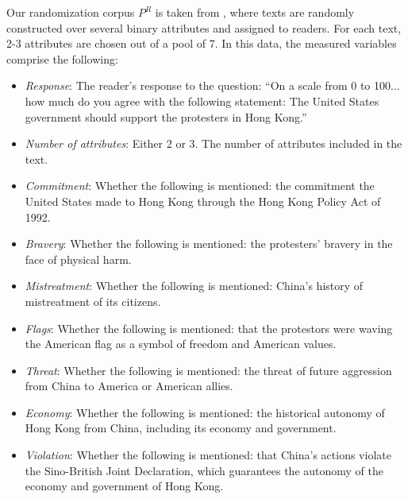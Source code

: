 \documentclass{article}
\begin{document}
Our randomization corpus $P^R$ is taken from \cite{fong2021causal}, where texts are randomly constructed over several binary attributes and assigned to readers. For each text, 2-3 attributes are chosen out of a pool of 7. In this data, the measured variables comprise the following:
\begin{itemize}
    \item \textit{Response}: The reader's response to the question: ``On a scale from 0 to 100... how much do you agree with the following statement: The United States government should support the protesters in Hong Kong.''
    \item \textit{Number of attributes}: Either 2 or 3. The number of attributes included in the text.
    \item \textit{Commitment}: Whether the following is mentioned: the commitment the United States made to Hong Kong through the Hong Kong Policy Act of 1992.
    \item \textit{Bravery}: Whether the following is mentioned: the protesters' bravery in the face of physical harm.
    \item \textit{Mistreatment}: Whether the following is mentioned: China's history of mistreatment of its citizens.
    \item \textit{Flags}: Whether the following is mentioned: that the protestors were waving the American flag as a symbol of freedom and American values.
    \item \textit{Threat}: Whether the following is mentioned: the threat of future aggression from China to America or American allies.
    \item \textit{Economy}: Whether the following is mentioned: the historical autonomy of Hong Kong from China, including its economy and government.
    \item \textit{Violation}: Whether the following is mentioned: that China's actions violate the Sino-British Joint Declaration, which guarantees the autonomy of the economy and government of Hong Kong.
\end{itemize}
\end{document}
